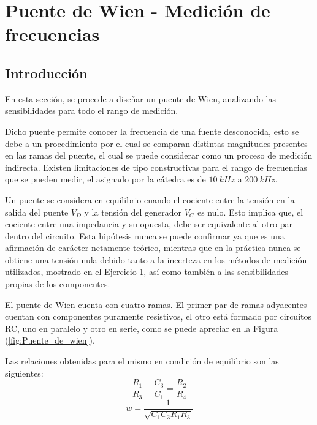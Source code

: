 


\section{Puente de Wien - Medición de frecuencias}

\subsection{Introducción}

En esta sección, se procede a diseñar un puente de Wien, analizando las sensibilidades para todo el rango de medición.

Dicho puente permite conocer la frecuencia de una fuente desconocida, esto se debe a un procedimiento por el cual se comparan distintas magnitudes presentes en las ramas del puente, el cual se puede considerar como un proceso de medición indirecta. Existen limitaciones de tipo constructivas para el rango de frecuencias que se pueden medir, el asignado por la cátedra es de $10 \ kHz$ a $200 \ kHz$.

Un puente se considera en equilibrio cuando el cociente entre la tensión en la salida del puente $V_D$ y la tensión del generador $V_G$ es nulo. Esto implica que, el cociente entre una impedancia y su opuesta, debe ser equivalente al otro par dentro del circuito. Esta hipótesis nunca se puede confirmar ya que es una afirmación de carácter netamente teórico, mientras que en la práctica nunca se obtiene una tensión nula debido tanto a la incerteza en los métodos de medición utilizados, mostrado en el Ejercicio 1, así como también a las sensibilidades propias de los componentes.

El puente de Wien cuenta con cuatro ramas. El primer par de ramas adyacentes cuentan con componentes puramente resistivos, el otro está formado por circuitos RC, uno en paralelo y otro en serie, como se puede apreciar en la Figura (\ref{fig:Puente_de_wien}).

Las relaciones obtenidas para el mismo en condición de equilibrio son las siguientes:
\begin{equation}
\frac{R_1}{R_3}+\frac{C_3}{C_1}=\frac{R_2}{R_4}
\end{equation}
\begin{equation}
w=\frac{1}{\sqrt{C_1C_3R_1R_3}}
\label{formula_frecuencia_sin_despejes}
\end{equation}

